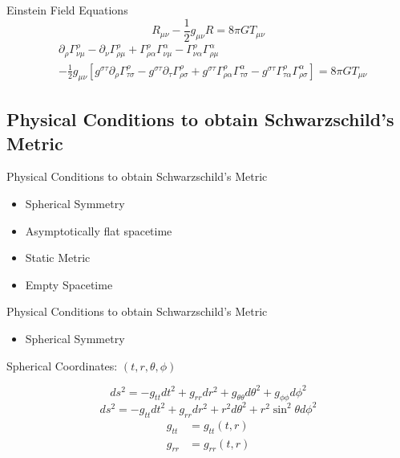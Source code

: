 \documentclass{beamer}
\begin{document}
\begin{darkframes}
        \begin{frame}{Einstein Field Equations}
			$$ R_{\mu\nu} - \frac{1}{2}g_{\mu\nu}R = 8\pi GT_{\mu\nu} $$
        	\pause
            \small{
			\begin{align*}
	            &\partial_{\rho}\Gamma_{\nu\mu}^{\rho}-	
    	        \partial_{\nu}\Gamma_{\rho\mu}^{\rho}+ 
        	    \Gamma_{\rho\alpha}^{\rho}\Gamma_{\nu\mu}^{\alpha}-
            	\Gamma_{\nu\alpha}^{\rho}\Gamma_{\rho\mu}^{\alpha} \\
            	&-\frac{1}{2}g_{\mu\nu} \left[ 
            	g^{\sigma\tau}\partial_{\rho}\Gamma_{\tau\sigma}^{\rho}- 	
            	g^{\sigma\tau}\partial_{\tau}\Gamma_{\rho\sigma}^{\rho}+  
            g^{\sigma\tau}\Gamma_{\rho\alpha}^{\rho}\Gamma_{\tau\sigma}^{\alpha}- 
            	g^{\sigma\tau}\Gamma_{\tau\alpha}^{\rho}\Gamma_{\rho\sigma}^{\alpha} 
            	\right] = 8\pi G T_{\mu\nu} 
            \end{align*} }
    	\end{frame}
       	
        \subsection{Physical Conditions to obtain Schwarzschild's Metric}
        \begin{frame}{Physical Conditions to obtain Schwarzschild's Metric}
        	\begin{itemize}
        	\item Spherical Symmetry
            \pause
            \item Asymptotically flat spacetime
            \pause
            \item Static Metric
            \pause
            \item Empty Spacetime
        	\end{itemize}
        \end{frame}
		
        \begin{frame}{Physical Conditions to obtain Schwarzschild's Metric}
        	\begin{itemize}
        	\item Spherical Symmetry
            \end{itemize}
			\pause
            Spherical Coordinates: $(t, r, \theta, \phi)$
            \pause
            \bigskip
            
            $$ ds^2 = - g_{tt} dt^2 + g_{rr} dr^2 + g_{\theta\theta} d\theta^2 + g_{\phi\phi} d\phi^2 $$
            \pause
            \bigskip
            $$ ds^2 = - g_{tt} dt^2 + g_{rr} dr^2 + r^2 d\theta^2 + r^2 \sin^2 \theta d\phi^2 $$
            \pause
            \begin{align*}
            g_{tt} &= g_{tt} (t,r)\\
            g_{rr} &= g_{rr} (t,r)
            \end{align*}
        \end{frame}
        

\end{darkframes}
\end{document}
